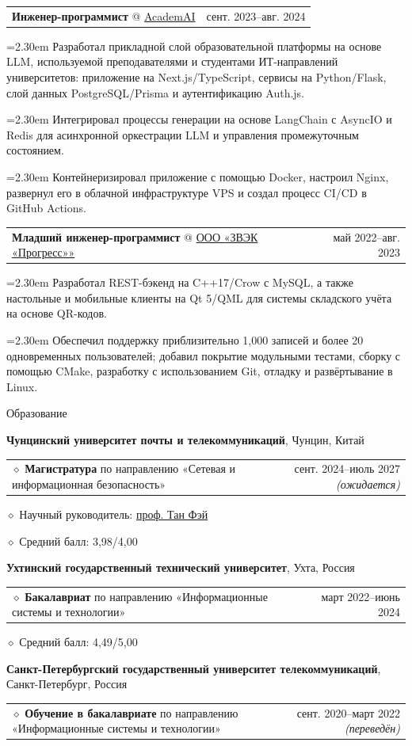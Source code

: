 \documentclass[11pt,a4paper]{article}
\makeatletter
\newcommand{\cvrow}[2]{%
  \noindent
  \begin{minipage}[t]{0.145\textwidth}
    \vspace{0pt}%
    \raggedright
    \fontsize{10.5}{12.5}\selectfont
    #1
  \end{minipage}%
  \hfill
  \begin{minipage}[t]{0.835\textwidth}
    \vspace{0pt}%
    #2
  \end{minipage}\par
}
\newcommand{\eduentry}[2]{%
  \noindent
  \begin{tabularx}{\linewidth}
    {@{}X@{\hspace{0.8em}}r@{}}
    #1 & \small #2
  \end{tabularx}\par
  \vspace{0.15em}
}
\newcommand{\edudetail}[1]{%
  \noindent\hspace*{1.15em}$\diamond$ #1\par
}
\newcommand{\workentry}[2]{%
  \noindent
  \begin{tabularx}{\linewidth}
    {@{}X@{\hspace{0.8em}}r@{}}
    #1 & \small #2
  \end{tabularx}\par
  \vspace{0.15em}
}
\newcommand{\workproject}[1]{%
  \noindent
  \hangindent=2.30em
  \hangafter=1
  \hspace*{1.15em}\makebox[1.15em][l]{$\diamond$}#1\par
  \vspace{0.12em}
}
\makeatother
\begin{document}
\cvrow{}{%
  \workentry
    {\textbf{Инженер-программист} @ \href{https://academai.ru/}{AcademAI}}
    {сент. 2023--авг. 2024}
  \workproject{Разработал прикладной слой образовательной платформы на основе
  LLM, используемой преподавателями и студентами ИТ-направлений университетов:
  приложение на Next.js/TypeScript, сервисы на Python/Flask, слой данных
  PostgreSQL/Prisma и аутентификацию Auth.js.}
  \workproject{Интегрировал процессы генерации на основе LangChain с AsyncIO
  и Redis для асинхронной оркестрации LLM и управления промежуточным состоянием.}
  \workproject{Контейнеризировал приложение с помощью Docker, настроил Nginx,
  развернул его в облачной инфраструктуре VPS и создал процесс CI/CD
  в GitHub Actions.}
}

\cvrow{}{%
  \workentry
    {\textbf{Младший инженер-программист} @
    \href{https://zvekprogress.ru/}{ООО «ЗВЭК «Прогресс»»}}
    {май 2022--авг. 2023}

  \workproject{Разработал REST-бэкенд на C++17/Crow с MySQL, а также настольные
  и мобильные клиенты на Qt 5/QML для системы складского учёта на основе QR-кодов.}

  \workproject{Обеспечил поддержку приблизительно 1,000 записей и более
  20 одновременных пользователей; добавил покрытие модульными тестами, сборку
  с помощью CMake, разработку с использованием Git, отладку и развёртывание в Linux.}
}

\vspace{0.75em}

\cvrow{Образование}{%
  \raggedright

  \textbf{Чунцинский университет почты и телекоммуникаций},
  Чунцин, Китай\par
  \vspace{0.12em}

  \eduentry
    {$\diamond$ \textbf{Магистратура} по направлению «Сетевая и информационная безопасность»}
    {сент. 2024--июль 2027 \textit{(ожидается)}}

  \edudetail{Научный руководитель:
    \href{https://faculty.cqupt.edu.cn/tangfei/en/index.htm}{проф. Тан Фэй}}
  \edudetail{Средний балл: 3,98/4,00}

  \vspace{0.48em}

  \textbf{Ухтинский государственный технический университет},
  Ухта, Россия\par
  \vspace{0.12em}

  \eduentry
    {$\diamond$ \textbf{Бакалавриат} по направлению «Информационные системы и технологии»}
    {март 2022--июнь 2024}

  \edudetail{Средний балл: 4,49/5,00}

  \vspace{0.48em}

  \textbf{Санкт-Петербургский государственный университет телекоммуникаций},
  Санкт-Петербург, Россия\par
  \vspace{0.12em}

  \eduentry
    {$\diamond$ \textbf{Обучение в бакалавриате} по направлению «Информационные системы и технологии»}
    {сент. 2020--март 2022 \textit{(переведён)}}
}
\end{document}
